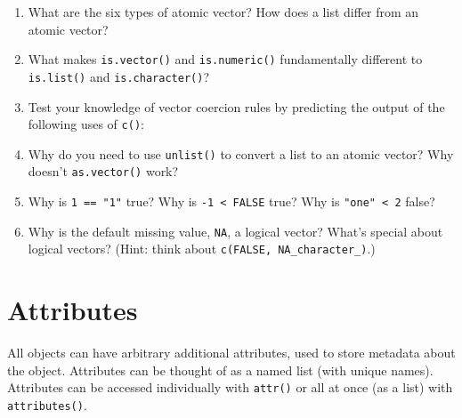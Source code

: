 \begin{enumerate}
\def\labelenumi{\arabic{enumi}.}
\item
  What are the six types of atomic vector? How does a list differ from
  an atomic vector?
\item
  What makes \texttt{is.vector()} and \texttt{is.numeric()}
  fundamentally different to \texttt{is.list()} and
  \texttt{is.character()}?
\item
  Test your knowledge of vector coercion rules by predicting the output
  of the following uses of \texttt{c()}:

\begin{Shaded}
\begin{Highlighting}[]
\NormalTok{(}\NormalTok{, }\NormalTok{)}
\NormalTok{(}\NormalTok{, }\NormalTok{)}
\NormalTok{(}\NormalTok{(}\NormalTok{), }\NormalTok{)}
\NormalTok{(}
\end{Highlighting}
\end{Shaded}
\item
  Why do you need to use \texttt{unlist()} to convert a list to an
  atomic vector? Why doesn't \texttt{as.vector()} work?
\item
  Why is \texttt{1\ ==\ "1"} true? Why is
  \texttt{-1\ \textless{}\ FALSE} true? Why is
  \texttt{"one"\ \textless{}\ 2} false?
\item
  Why is the default missing value, \texttt{NA}, a logical vector?
  What's special about logical vectors? (Hint: think about
  \texttt{c(FALSE,\ NA\_character\_)}.)
\end{enumerate}

\hypertarget{attributes}{%
\section{Attributes}\label{attributes}}

All objects can have arbitrary additional attributes, used to store
metadata about the object. Attributes can be thought of as a named list
(with unique names). Attributes can be accessed individually with
\texttt{attr()} or all at once (as a list) with \texttt{attributes()}.

\begin{Shaded}
\begin{Highlighting}[]
\StringTok{ }\OperatorTok{:}
\NormalTok{) <-}
\NormalTok{)}
\end{Highlighting}
\end{Shaded}

